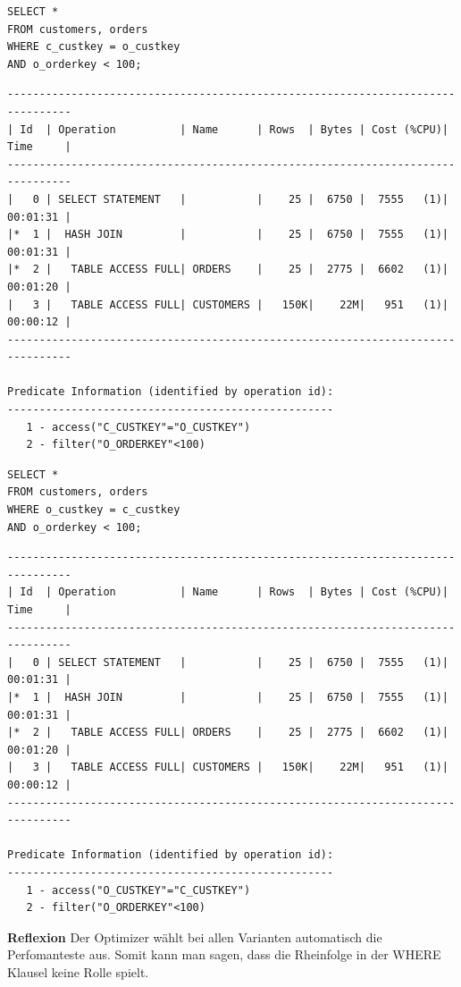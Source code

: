 \documentclass[10pt]{article}
\begin{document}
\begin{lstlisting}[style=sql]
SELECT *
FROM customers, orders
WHERE c_custkey = o_custkey
AND o_orderkey < 100;
\end{lstlisting}
\begin{lstlisting}[style=queryexecutionplan]
--------------------------------------------------------------------------------
| Id  | Operation          | Name      | Rows  | Bytes | Cost (%CPU)| Time     |
--------------------------------------------------------------------------------
|   0 | SELECT STATEMENT   |           |    25 |  6750 |  7555   (1)| 00:01:31 |
|*  1 |  HASH JOIN         |           |    25 |  6750 |  7555   (1)| 00:01:31 |
|*  2 |   TABLE ACCESS FULL| ORDERS    |    25 |  2775 |  6602   (1)| 00:01:20 |
|   3 |   TABLE ACCESS FULL| CUSTOMERS |   150K|    22M|   951   (1)| 00:00:12 |
--------------------------------------------------------------------------------

Predicate Information (identified by operation id):
---------------------------------------------------
   1 - access("C_CUSTKEY"="O_CUSTKEY")
   2 - filter("O_ORDERKEY"<100)
\end{lstlisting}
\begin{lstlisting}[style=sql]
SELECT *
FROM customers, orders
WHERE o_custkey = c_custkey
AND o_orderkey < 100;
\end{lstlisting}
\begin{lstlisting}[style=queryexecutionplan]
--------------------------------------------------------------------------------
| Id  | Operation          | Name      | Rows  | Bytes | Cost (%CPU)| Time     |
--------------------------------------------------------------------------------
|   0 | SELECT STATEMENT   |           |    25 |  6750 |  7555   (1)| 00:01:31 |
|*  1 |  HASH JOIN         |           |    25 |  6750 |  7555   (1)| 00:01:31 |
|*  2 |   TABLE ACCESS FULL| ORDERS    |    25 |  2775 |  6602   (1)| 00:01:20 |
|   3 |   TABLE ACCESS FULL| CUSTOMERS |   150K|    22M|   951   (1)| 00:00:12 |
--------------------------------------------------------------------------------

Predicate Information (identified by operation id):
---------------------------------------------------
   1 - access("O_CUSTKEY"="C_CUSTKEY")
   2 - filter("O_ORDERKEY"<100)
\end{lstlisting}
\textbf{Reflexion} \newline
Der Optimizer wählt bei allen Varianten automatisch die Perfomanteste aus. Somit kann man 
sagen, dass die Rheinfolge in der WHERE Klausel keine Rolle spielt.
\end{document}
